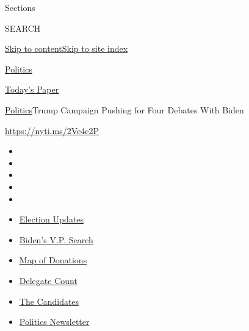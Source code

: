 Sections

SEARCH

\protect\hyperlink{site-content}{Skip to
content}\protect\hyperlink{site-index}{Skip to site index}

\href{https://www.nytimes.com/section/politics}{Politics}

\href{https://myaccount.nytimes.com/auth/login?response_type=cookie\&client_id=vi}{}

\href{https://www.nytimes.com/section/todayspaper}{Today's Paper}

\href{/section/politics}{Politics}\textbar{}Trump Campaign Pushing for
Four Debates With Biden

\url{https://nyti.ms/2Ve4c2P}

\begin{itemize}
\item
\item
\item
\item
\item
\end{itemize}

\begin{itemize}
\item
  \href{https://www.nytimes.com/2020/07/31/us/elections/biden-vs-trump.html?action=click\&pgtype=Article\&state=default\&region=TOP_BANNER\&context=storylines_menu}{Election
  Updates}
\item
  \href{https://www.nytimes.com/article/biden-vice-president-2020.html?action=click\&pgtype=Article\&state=default\&region=TOP_BANNER\&context=storylines_menu}{Biden's
  V.P. Search}
\item
  \href{https://www.nytimes.com/interactive/2020/07/24/us/politics/trump-biden-campaign-donors.html?action=click\&pgtype=Article\&state=default\&region=TOP_BANNER\&context=storylines_menu}{Map
  of Donations}
\item
  \href{https://www.nytimes.com/interactive/2020/us/elections/delegate-count-primary-results.html?action=click\&pgtype=Article\&state=default\&region=TOP_BANNER\&context=storylines_menu}{Delegate
  Count}
\item
  \href{https://www.nytimes.com/interactive/2019/us/politics/2020-presidential-candidates.html?action=click\&pgtype=Article\&state=default\&region=TOP_BANNER\&context=storylines_menu}{The
  Candidates}
\item
  \href{https://www.nytimes.com/newsletters/politics?action=click\&pgtype=Article\&state=default\&region=TOP_BANNER\&context=storylines_menu}{Politics
  Newsletter}
\end{itemize}

